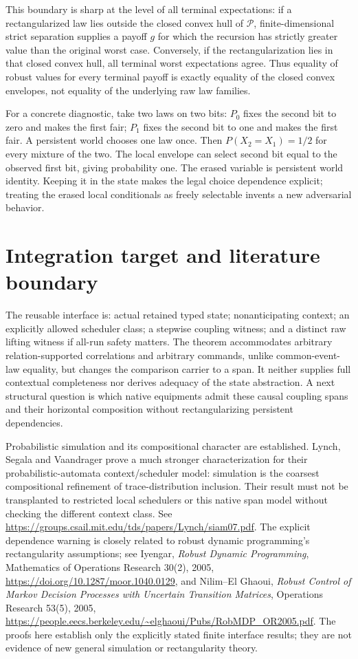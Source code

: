 \documentclass[11pt]{article}
\begin{document}
This boundary is sharp at the level of all terminal expectations: if a rectangularized law lies outside the closed convex hull of $\mathcal P$, finite-dimensional strict separation supplies a payoff $g$ for which the recursion has strictly greater value than the original worst case. Conversely, if the rectangularization lies in that closed convex hull, all terminal worst expectations agree. Thus equality of robust values for every terminal payoff is exactly equality of the closed convex envelopes, not equality of the underlying raw law families.

For a concrete diagnostic, take two laws on two bits: $P_0$ fixes the second bit to zero and makes the first fair; $P_1$ fixes the second bit to one and makes the first fair. A persistent world chooses one law once. Then $P(X_2=X_1)=1/2$ for every mixture of the two. The local envelope can select second bit equal to the observed first bit, giving probability one. The erased variable is persistent world identity. Keeping it in the state makes the legal choice dependence explicit; treating the erased local conditionals as freely selectable invents a new adversarial behavior.

\section{Integration target and literature boundary}
The reusable interface is: actual retained typed state; nonanticipating context; an explicitly allowed scheduler class; a stepwise coupling witness; and a distinct raw lifting witness if all-run safety matters. The theorem accommodates arbitrary relation-supported correlations and arbitrary commands, unlike common-event-law equality, but changes the comparison carrier to a span. It neither supplies full contextual completeness nor derives adequacy of the state abstraction. A next structural question is which native equipments admit these causal coupling spans and their horizontal composition without rectangularizing persistent dependencies.

Probabilistic simulation and its compositional character are established. Lynch, Segala and Vaandrager prove a much stronger characterization for their probabilistic-automata context/scheduler model: simulation is the coarsest compositional refinement of trace-distribution inclusion. Their result must not be transplanted to restricted local schedulers or this native span model without checking the different context class. See \url{https://groups.csail.mit.edu/tds/papers/Lynch/siam07.pdf}. The explicit dependence warning is closely related to robust dynamic programming's rectangularity assumptions; see Iyengar, \emph{Robust Dynamic Programming}, Mathematics of Operations Research 30(2), 2005, \url{https://doi.org/10.1287/moor.1040.0129}, and Nilim--El Ghaoui, \emph{Robust Control of Markov Decision Processes with Uncertain Transition Matrices}, Operations Research 53(5), 2005, \url{https://people.eecs.berkeley.edu/~elghaoui/Pubs/RobMDP_OR2005.pdf}. The proofs here establish only the explicitly stated finite interface results; they are not evidence of new general simulation or rectangularity theory.
\end{document}
